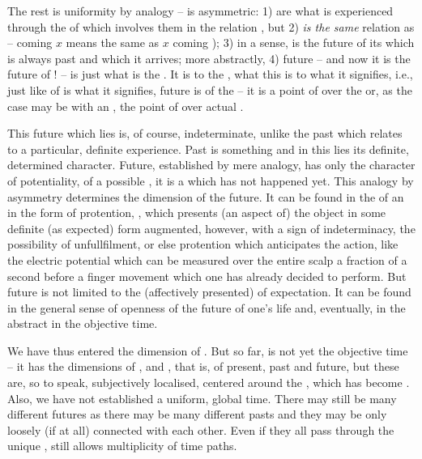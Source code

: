 The rest is uniformity by analogy --  is asymmetric: 1) 
are what is experienced through the  of  which
involves them in the relation {}, but 2)  {\em is the same}
relation as  --  coming  $x$ means the same
as $x$ coming  ); 3) in a sense,  is
the future of its  which is always past and  which it arrives;
more abstractly, 4) future -- and now it is the future of ! -- is
just what is  the . It is to the , what this  is to what it signifies, i.e., just like  of
 is  what it signifies, future is  of the
 -- it is a point of  over the  or, as the case may be with an , the point
of  over actual .

This future which lies  is, of course, indeterminate, unlike the past
 which  relates to a particular, definite experience.
Past is something  and in this lies its definite,
determined character. Future, established by mere analogy, has only the
character of potentiality, of a possible , it is a
 which has not happened yet.  This analogy by asymmetry
determines the dimension of the future. It can be found in the  of
an  in the form of protention, , which
presents (an aspect of) the object in some definite (as expected) form
augmented, however, with a sign of indeterminacy, the possibility of
unfullfilment, or else protention which anticipates the  action,
like the electric potential which can be measured over the entire scalp a
fraction of a second before a finger movement which one has already decided to
perform.  But future is not limited to the (affectively presented)
 of expectation. It 
can be found in the general sense of openness of the future of one's
life and, eventually, in the abstract  in the objective
time.


\label{sub:objectiveTime}

\pa\label{pa:temporality}
We have thus entered the dimension of . 
But so far,  is not yet the objective 
time -- it has the dimensions of ,  and 
, that is, of present, past and future, but these are, so 
to speak, subjectively localised, centered around the \herenow, which 
has become . 
Also, we have not established a uniform, global time. There may still be 
many different futures as there may be many different pasts and they 
may be only loosely (if at all) connected with each other. Even if 
they all pass through the unique ,  still allows 
multiplicity of time paths. 

